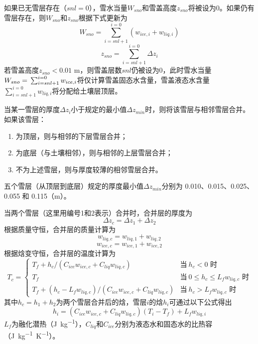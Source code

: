 如果已无雪层存在（$snl=0$），雪水当量$W_{sno}$和雪盖高度$z_{sno}$将被设为0。如果仍有雪层存在，则$W_{sno}$和$z_{sno}$根据下式更新为
\begin{equation}
    W_{sno} = \sum_{i=snl+1}^{i=0}\left(w_{ice,i}+w_{liq,i}\right)
\end{equation}
\begin{equation}
    z_{sno} = \sum_{i=snl+1}^{i=0} \Delta z_i
\end{equation}
若雪盖高度$z_{sno} < 0.01$ \unit{m}，则雪盖层数$snl$仍被设为0，此时雪水当量$W_{sno}=\\\sum_{i=snl+1}^{i=0} w_{ice,i}$将仅计算雪盖固态水含量，雪盖液态水含量$\sum_{i=snl+1}^{i=0} w_{liq,i}$将分配给土壤层顶层。

当某一雪层的厚度$\Delta z_i$小于规定的最小值$\Delta z_{min}$时，则将该雪层与相邻雪层合并。如果该雪层：
\begin{enumerate}
\item 为顶层，则与相邻的下层雪层合并；
\item 为底层（与土壤相邻），则与相邻的上层雪层合并；
\item 不为上述雪层，则与厚度较薄的相邻雪层合并。
\end{enumerate}

五个雪层（从顶层到底层）规定的厚度最小值$\Delta z_{min}$分别为 0.010、0.015、0.025、0.055 和 0.115（\unit{m}）。

当两个雪层（这里用编号1和2表示）合并时，合并层的厚度为
\begin{equation}\label{eq:SnowCombThick}
\Delta {z}_c=\Delta {z}_{1}+\Delta {z}_{2}
\end{equation}
根据质量守恒，合并层的质量计算为
\begin{equation}
w_{liq,c}=w_{liq,1}+w_{liq,2}
\end{equation}
\begin{equation}
w_{ice,c}=w_{ice,1}+w_{ice,2}
\end{equation}
根据焓变守恒，合并层的温度计算为
\begin{equation}\label{eq:SnowCombTemp}
T_c=\begin{cases}
    T_f+{h_c}/\left(C_{ice}w_{ice,c}+C_{liq}w_{liq,c}\right) &\text{当}\ h_c<0 \text{ 时} \\
    T_f &\text{当}\ 0 \leqslant h_c \leqslant L_f w_{liq,c} \text{ 时}\\
    T_f+\left(h_c-L_f w_{liq,c}\right)/\left(C_{ice} w_{ice,c}+C_{liq} w_{liq,c}\right) &\text{当}\ h_c > L_f w_{liq,c} \text{ 时}
\end{cases}
\end{equation}
其中$h_c=h_1+h_2$为两个雪层合并后的焓，雪层$i$的焓$h_i$可通过以下公式得出
\begin{equation}
    h_i=\left(C_{ice}w_{ice,c}+C_{liq}w_{liq,c}\right)\left(T_i-T_f\right)+L_fw_{liq,i}
\end{equation}
$L_f$为融化潜热（\unit{J.kg^{-1}}），$C_{liq}$和$C_{ice}$分别为液态水和固态水的比热容（\unit{J.kg^{-1}.K^{-1}}）。

